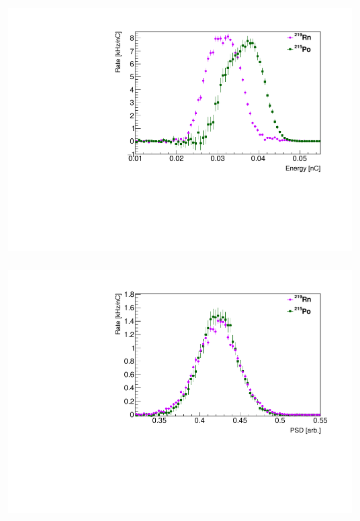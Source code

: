 \begin{figure}[H]
	\centering
\begin{subfigure}{0.5\linewidth}
	\centering
	\includegraphics[width=1.\linewidth]{"tex/6-ac227-images/BNL/RnPoEn_TimeBin23_S2"}
	\caption{}
\end{subfigure}%
\begin{subfigure}{0.5\linewidth}
	\centering
	\includegraphics[width=1.\linewidth]{"tex/6-ac227-images/BNL/RnPoPSD_TimeBin23_S2"}
	\caption{}
\end{subfigure}
	\caption{}
	\label{fig:rnpoenpsd}
\end{figure}



